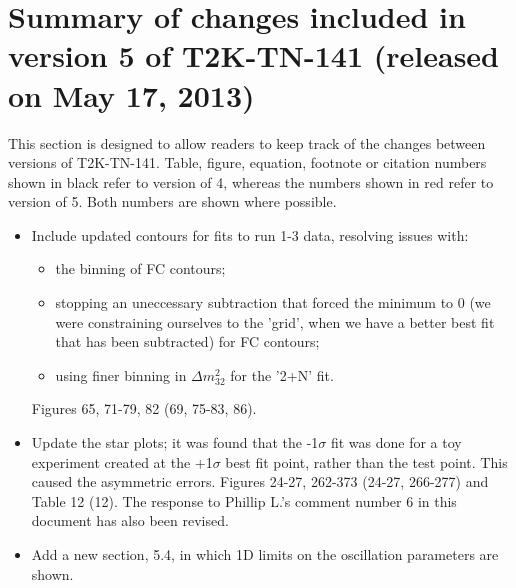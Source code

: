 
\section{Summary of changes included in version 5 of T2K-TN-141 (released on May 17, 2013)}

This section is designed to allow readers to keep track of the changes between versions of T2K-TN-141.
Table, figure, equation, footnote or citation numbers shown in black refer to version of 4,
{\color{red}whereas the numbers shown in red refer to version of 5}.
Both numbers are shown where possible.

\begin{itemize}

\item
  Include updated contours for fits to run 1-3 data, resolving
  issues with:
  \begin{itemize}
  \item the binning of FC contours;
  \item stopping an uneccessary subtraction that forced the minimum to 0
    (we were constraining ourselves to the
    'grid', when we have a better best fit that has been subtracted)
    for FC contours;
  \item using finer binning in $\Delta m^2_{32}$ for the '2+N' fit.
  \end{itemize}
  Figures 65, 71-79, 82 {\color{red}(69, 75-83, 86)}.

\item
  Update the star plots; it was found that the -1$\sigma$ fit was done
  for a toy experiment created at the +1$\sigma$ best fit point, rather
  than the test point. This caused the asymmetric errors.
  Figures 24-27, 262-373 {\color{red}(24-27, 266-277)} and Table 12
  {\color{red}(12)}.
  The response to Phillip L.'s comment number 6 in this document has
  also been revised.

\item
  Add a new section, 5.4, in which 1D limits on the oscillation
  parameters are shown.


\end{itemize}





